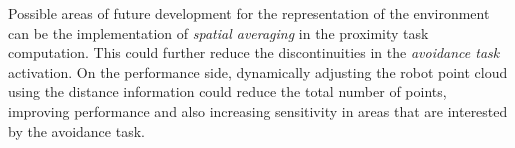 Possible areas of future development for the representation of the environment can be the implementation of \textit{spatial averaging} in the proximity task computation. This could further reduce the discontinuities in the \textit{avoidance task} activation. On the performance side, dynamically adjusting the robot point cloud using the distance information could reduce the total number of points, improving performance and also increasing sensitivity in areas that are interested by the avoidance task. 




